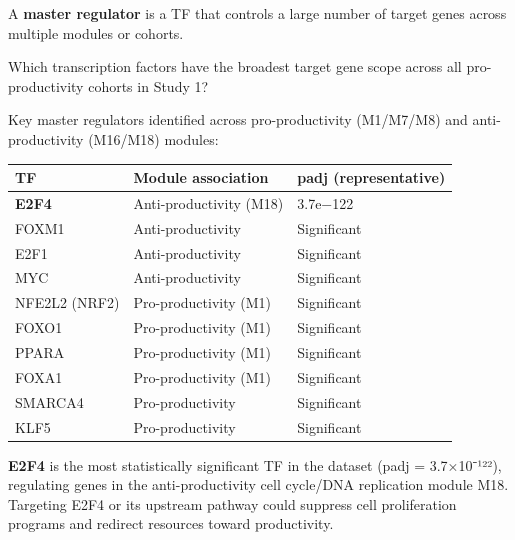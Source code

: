 \documentclass[
  letterpaper,
  oneside,
  open=any]{scrbook}
\newcounter{none} %
\begin{document}
A \textbf{master regulator} is a TF that controls a large number of
target genes across multiple modules or cohorts.

Which transcription factors have the broadest target gene scope across
all pro-productivity cohorts in Study 1?

Key master regulators identified across pro-productivity (M1/M7/M8) and
anti-productivity (M16/M18) modules:

{\def\LTcaptype{none} %
\begin{longtable}[]{@{}lll@{}}
\toprule\noalign{}
TF & Module association & padj (representative) \\
\midrule\noalign{}
\endhead
\bottomrule\noalign{}
\endlastfoot
\textbf{E2F4} & Anti-productivity (M18) & 3.7e−122 \\
FOXM1 & Anti-productivity & Significant \\
E2F1 & Anti-productivity & Significant \\
MYC & Anti-productivity & Significant \\
NFE2L2 (NRF2) & Pro-productivity (M1) & Significant \\
FOXO1 & Pro-productivity (M1) & Significant \\
PPARA & Pro-productivity (M1) & Significant \\
FOXA1 & Pro-productivity (M1) & Significant \\
SMARCA4 & Pro-productivity & Significant \\
KLF5 & Pro-productivity & Significant \\
\end{longtable}
}

\begin{tcolorbox}[enhanced jigsaw, arc=.35mm, bottomrule=.15mm, bottomtitle=1mm, breakable, colback=white, colbacktitle=quarto-callout-note-color!10!white, colframe=quarto-callout-note-color-frame, coltitle=black, left=2mm, leftrule=.75mm, opacityback=0, opacitybacktitle=0.6, rightrule=.15mm, title=\textcolor{quarto-callout-note-color}{\faInfo}\hspace{0.5em}{Note}, titlerule=0mm, toprule=.15mm, toptitle=1mm]

\textbf{E2F4} is the most statistically significant TF in the dataset
(padj = 3.7×10⁻¹²²), regulating genes in the anti-productivity cell
cycle/DNA replication module M18. Targeting E2F4 or its upstream pathway
could suppress cell proliferation programs and redirect resources toward
productivity.

\end{tcolorbox}
\end{document}
